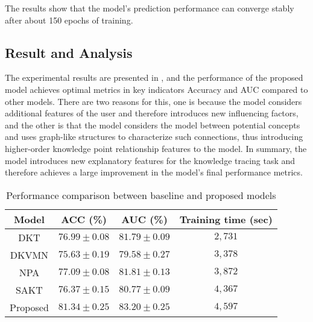 The results show that the model's prediction performance can converge stably after about 150 epochs of training.
\subsection{Result and Analysis}
The experimental results are presented in \tblname{\ref{tbl:ch3-performance}}, and the performance of the proposed model achieves optimal metrics in key indicators Accuracy and AUC compared to other models. There are two reasons for this, one is because the model considers additional features of the user and therefore introduces new influencing factors, and the other is that the model considers the model between potential concepts and uses graph-like structures to characterize such connections, thus introducing higher-order knowledge point relationship features to the model. In summary, the model introduces new explanatory features for the knowledge tracing task and therefore achieves a large improvement in the model's final performance metrics.

\begin{table}[htb]
    \centering
    \caption{Performance comparison between baseline and proposed models}\label{tbl:ch3-performance}
    \begin{tabular}{cccc}
        \toprule
        Model    & ACC (\%)                    & AUC (\%)                   & Training time (sec) \\
        \midrule
        DKT      & \(76.99\pm 0.08 \)          & \(81.79\pm 0.09\)          & \(2,731\)           \\
        DKVMN    & \(75.63\pm 0.19 \)          & \(79.58\pm 0.27\)          & \(3,378\)           \\
        NPA      & \(77.09\pm 0.08\)           & \(81.81\pm 0.13\)          & \(3,872\)           \\
        SAKT     & \(76.37\pm 0.15\)           & \(80.77\pm 0.09\)          & \(4,367\)           \\
        \midrule
        Proposed & \(\mathbf{81.34\pm 0.25} \) & \(\mathbf{83.20\pm 0.25}\) & \(4,597\)           \\
        \bottomrule
    \end{tabular}
\end{table}

